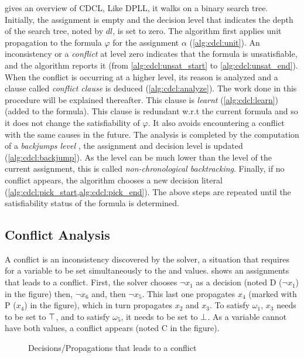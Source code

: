  gives an overview of CDCL, Like DPLL,  it walks on a binary search tree.
Initially, the  assignment is empty and the decision level that 
indicates the depth of the search tree, noted by $dl$, is set to zero.
The algorithm first applies unit propagation to the formula $\varphi$ for the  assignment $\alpha$ (\cref{alg:cdcl:unit}).
An inconsistency or a \emph{conflict} at level zero indicates that the formula is unsatisfiable, and the algorithm
reports it (from \cref{alg:cdcl:unsat_start} to \cref{alg:cdcl:unsat_end}). When the conflict is occurring at a higher level, its reason is analyzed and a clause called \emph{conflict clause} is deduced (\cref{alg:cdcl:analyze}).
The work done in this procedure will be explained thereafter.
This clause is \emph{learnt} (\cref{alg:cdcl:learn}) (added to the formula). This clause is redundant w.r.t the current
formula and so it does not change the satisfiability of $\varphi$. It also avoids encountering a conflict with the same
causes in the future.
The analysis is completed by the computation of a \emph{backjumps level} , the assignment and decision level is updated (\cref{alg:cdcl:backjump}). As the level can be much lower than the level of the current assignment, this is called \emph{non-chronological backtracking}.
Finally, if no conflict appears, the algorithm chooses a new decision literal 
(\cref{alg:cdcl:pick_start,alg:cdcl:pick_end}).
The above steps are repeated until the satisfiability status of the
formula is determined.

\subsection{Conflict Analysis}
A conflict is an inconsistency discovered by the solver, a situation that requires for a variable to be set 
simultaneously to the \true and \false values.  shows an assignments that leads to a conflict.
First, the solver chooses $\neg x_1$ as a decision (noted D ($\neg x_1$) in the figure) then, $\neg x_6$ and, then $\neg x_5$. This last one propagates $x_4$ (marked with P ($x_4$) in the figure),
which in turn propagates $x_2$ and $x_3$.
To satisfy $\omega_1$, $x_3$ needs to be set to $\top$, and  to satisfy $\omega_5$, 
it needs to be set to $\bot$. As a variable cannot have both values, a conflict appears (noted C in the figure).
\begin{figure}[!htbp]
 \centering
  
 \caption{Decisions/Propagations that leads to a  conflict}
 \label{fig:conflict}
\end{figure}


